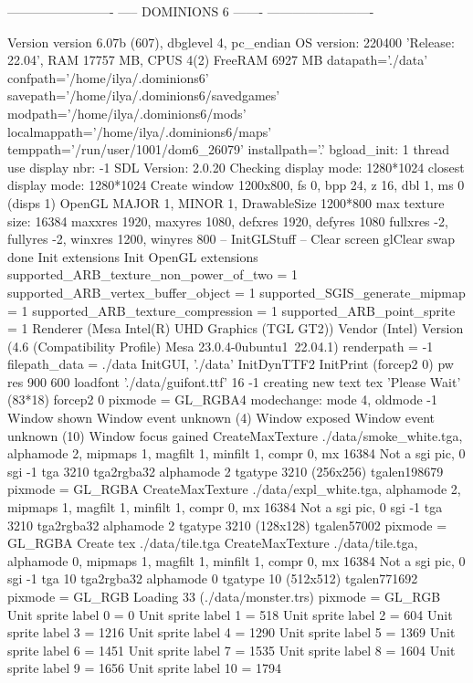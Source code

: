 
-------------------------
----- DOMINIONS 6 -------
-------------------------

Version version 6.07b (607), dbglevel 4, pc_endian
OS version: 220400 'Release:	22.04', RAM 17757 MB, CPUS 4(2)
FreeRAM 6927 MB
datapath='./data'
confpath='/home/ilya/.dominions6'
savepath='/home/ilya/.dominions6/savedgames'
modpath='/home/ilya/.dominions6/mods'
localmappath='/home/ilya/.dominions6/maps'
temppath='/run/user/1001/dom6_26079'
installpath='.'
bgload_init: 1 thread
use display nbr: -1
SDL Version: 2.0.20
Checking display mode: 1280*1024
  closest display mode: 1280*1024
Create window 1200x800, fs 0, bpp 24, z 16, dbl 1, ms 0 (disps 1)
OpenGL MAJOR 1, MINOR 1, DrawableSize 1200*800
max texture size: 16384
maxxres 1920, maxyres 1080, defxres 1920, defyres 1080
fullxres -2, fullyres -2, winxres 1200, winyres 800
-- InitGLStuff --
Clear screen
glClear
swap
done
Init extensions
Init OpenGL extensions
supported_ARB_texture_non_power_of_two = 1
supported_ARB_vertex_buffer_object = 1
supported_SGIS_generate_mipmap = 1
supported_ARB_texture_compression = 1
supported_ARB_point_sprite = 1
Renderer (Mesa Intel(R) UHD Graphics (TGL GT2))
Vendor (Intel)
Version (4.6 (Compatibility Profile) Mesa 23.0.4-0ubuntu1~22.04.1)
renderpath = -1
filepath_data = ./data
InitGUI, './data'
InitDynTTF2
InitPrint (forcep2 0)
pw res 900 600
loadfont './data/guifont.ttf' 16 -1
creating new text tex 'Please Wait' (83*18) forcep2 0
pixmode = GL_RGBA4
modechange: mode 4, oldmode -1
Window shown
Window event unknown (4)
Window exposed
Window event unknown (10)
Window focus gained
CreateMaxTexture ./data/smoke_white.tga, alphamode 2, mipmaps 1, magfilt 1, minfilt 1, compr 0, mx 16384
Not a sgi pic, 0
sgi -1
tga 3210
tga2rgba32 alphamode 2 tgatype 3210 (256x256) tgalen198679
pixmode = GL_RGBA
CreateMaxTexture ./data/expl_white.tga, alphamode 2, mipmaps 1, magfilt 1, minfilt 1, compr 0, mx 16384
Not a sgi pic, 0
sgi -1
tga 3210
tga2rgba32 alphamode 2 tgatype 3210 (128x128) tgalen57002
pixmode = GL_RGBA
Create tex ./data/tile.tga
CreateMaxTexture ./data/tile.tga, alphamode 0, mipmaps 1, magfilt 1, minfilt 1, compr 0, mx 16384
Not a sgi pic, 0
sgi -1
tga 10
tga2rgba32 alphamode 0 tgatype 10 (512x512) tgalen771692
pixmode = GL_RGB
Loading 33 (./data/monster.trs)
pixmode = GL_RGB
Unit sprite label 0 = 0
Unit sprite label 1 = 518
Unit sprite label 2 = 604
Unit sprite label 3 = 1216
Unit sprite label 4 = 1290
Unit sprite label 5 = 1369
Unit sprite label 6 = 1451
Unit sprite label 7 = 1535
Unit sprite label 8 = 1604
Unit sprite label 9 = 1656
Unit sprite label 10 = 1794
